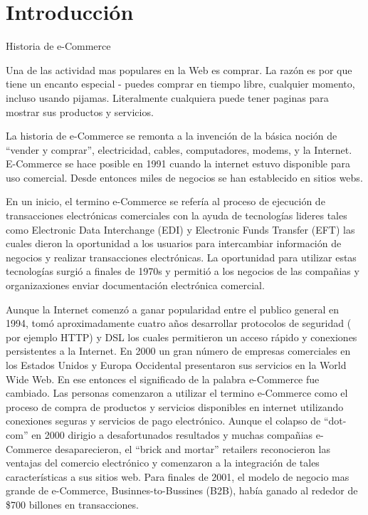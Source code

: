 \chapter{Introducción}\label{cap:intro}

Historia de e-Commerce

Una de las actividad mas populares en la Web es comprar. La razón es por que tiene un encanto especial - puedes comprar en tiempo libre, cualquier momento, incluso usando pijamas. Literalmente cualquiera puede tener paginas para mostrar sus productos y servicios.

La historia de e-Commerce se remonta a la invención de la básica noción de “vender y comprar”, electricidad, cables, computadores, modems, y la Internet. E-Commerce se hace posible en 1991 cuando la internet estuvo disponible para uso comercial. Desde entonces miles de negocios se han establecido en sitios webs.

En un inicio, el termino e-Commerce se refería al proceso de ejecución  de transacciones electrónicas comerciales con la ayuda de tecnologías lideres tales como Electronic Data Interchange (EDI) y Electronic Funds Transfer (EFT) las cuales dieron la oportunidad a los usuarios para intercambiar información de negocios y realizar transacciones electrónicas. La oportunidad para utilizar estas tecnologías surgió a finales de 1970s y permitió a los negocios de las compañias y organizaxiones enviar documentación electrónica comercial.

Aunque la Internet comenzó a ganar popularidad  entre el publico general en 1994, tomó aproximadamente cuatro años desarrollar protocolos de seguridad ( por ejemplo HTTP)  y DSL los cuales permitieron un acceso rápido y conexiones persistentes a la Internet. En 2000 un gran número de empresas comerciales en los Estados Unidos y Europa Occidental presentaron sus servicios en la World Wide Web. En ese entonces el significado de la palabra e-Commerce fue cambiado. Las personas comenzaron a utilizar el termino e-Commerce como el proceso de compra de productos y servicios disponibles en internet utilizando conexiones seguras y servicios de pago electrónico. Aunque el colapso de “dot-com” en 2000 dirigio a desafortunados resultados y muchas compañias e-Commerce desaparecieron, el “brick and mortar” retailers reconocieron las ventajas del comercio electrónico y comenzaron a la integración de tales características a sus sitios web. Para finales de 2001, el modelo de negocio mas grande de e-Commerce, Businnes-to-Bussines (B2B), había ganado al rededor de \$700 billones en transacciones.

